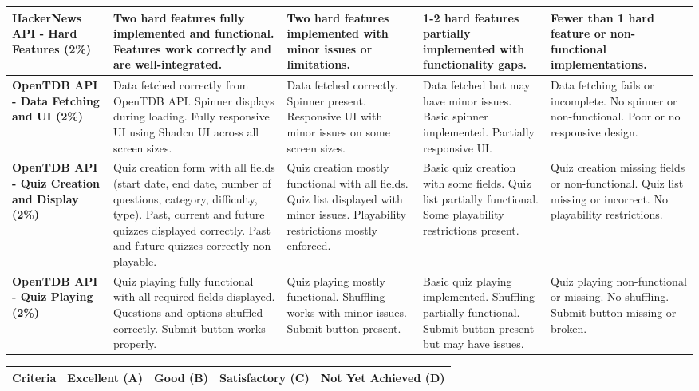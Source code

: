 \documentclass{article}
\begin{document}
\begin{landscape}
\begin{tabular}{|p{5cm}|p{4cm}|p{4cm}|p{4cm}|p{4cm}|}
\textbf{HackerNews API - Hard Features (2\%)} & 
Two hard features fully implemented and functional. Features work correctly and are well-integrated. & 
Two hard features implemented with minor issues or limitations. & 
1-2 hard features partially implemented with functionality gaps. & 
Fewer than 1 hard feature or non-functional implementations. \\ \hline

\textbf{OpenTDB API - Data Fetching and UI (2\%)} & 
Data fetched correctly from OpenTDB API. Spinner displays during loading. Fully responsive UI using Shadcn UI across all screen sizes. & 
Data fetched correctly. Spinner present. Responsive UI with minor issues on some screen sizes. & 
Data fetched but may have minor issues. Basic spinner implemented. Partially responsive UI. & 
Data fetching fails or incomplete. No spinner or non-functional. Poor or no responsive design. \\ \hline

\textbf{OpenTDB API - Quiz Creation and Display (2\%)} & 
Quiz creation form with all fields (start date, end date, number of questions, category, difficulty, type). Past, current and future quizzes displayed correctly. Past and future quizzes correctly non-playable. & 
Quiz creation mostly functional with all fields. Quiz list displayed with minor issues. Playability restrictions mostly enforced. & 
Basic quiz creation with some fields. Quiz list partially functional. Some playability restrictions present. & 
Quiz creation missing fields or non-functional. Quiz list missing or incorrect. No playability restrictions. \\ \hline

\textbf{OpenTDB API - Quiz Playing (2\%)} & 
Quiz playing fully functional with all required fields displayed. Questions and options shuffled correctly. Submit button works properly. & 
Quiz playing mostly functional. Shuffling works with minor issues. Submit button present. & 
Basic quiz playing implemented. Shuffling partially functional. Submit button present but may have issues. & 
Quiz playing non-functional or missing. No shuffling. Submit button missing or broken. \\ \hline

\end{tabular}

\begin{tabular}{|p{5cm}|p{4cm}|p{4cm}|p{4cm}|p{4cm}|}
\hline
\textbf{Criteria} & \textbf{Excellent (A)} & \textbf{Good (B)} & \textbf{Satisfactory (C)} & \textbf{Not Yet Achieved (D)} \\ \hline


\end{tabular}
\end{landscape}
\end{document}
